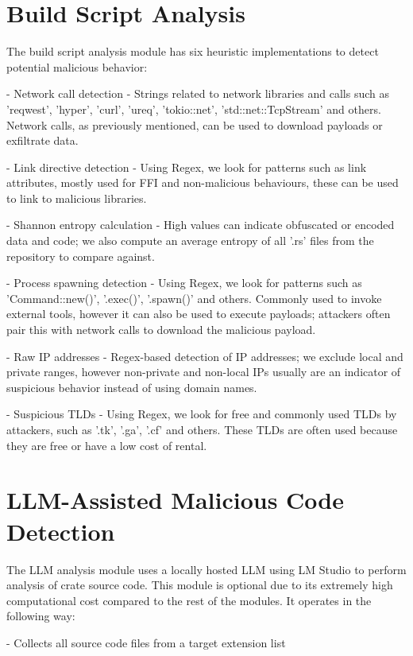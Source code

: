 \section{Build Script Analysis}\label{sect:build-script}

The build script analysis module has six heuristic implementations to detect potential malicious behavior:

- Network call detection - Strings related to network libraries and calls such as 'reqwest', 'hyper', 'curl', 'ureq', 'tokio::net', 'std::net::TcpStream' and others. Network calls, as previously mentioned, can be used to download payloads or exfiltrate data.

- Link directive detection - Using Regex, we look for patterns such as link attributes, mostly used for FFI and non-malicious behaviours, these can be used to link to malicious libraries.

- Shannon entropy calculation - High values can indicate obfuscated or encoded data and code; we also compute an average entropy of all '.rs' files from the repository to compare against.

- Process spawning detection - Using Regex, we look for patterns such as 'Command::new()', '.exec()', '.spawn()' and others. Commonly used to invoke external tools, however it can also be used to execute payloads; attackers often pair this with network calls to download the malicious payload.

- Raw IP addresses - Regex-based detection of IP addresses; we exclude local and private ranges, however non-private and non-local IPs usually are an indicator of suspicious behavior instead of using domain names.

- Suspicious TLDs - Using Regex, we look for free and commonly used TLDs by attackers, such as '.tk', '.ga', '.cf' and others. These TLDs are often used because they are free or have a low cost of rental.

\section{LLM-Assisted Malicious Code Detection}\label{sect:llm-detect}

The LLM analysis module uses a locally hosted LLM using LM Studio to perform analysis of crate source code. This module is optional due to its extremely high computational cost compared to the rest of the modules.
It operates in the following way:

- Collects all source code files from a target extension list

